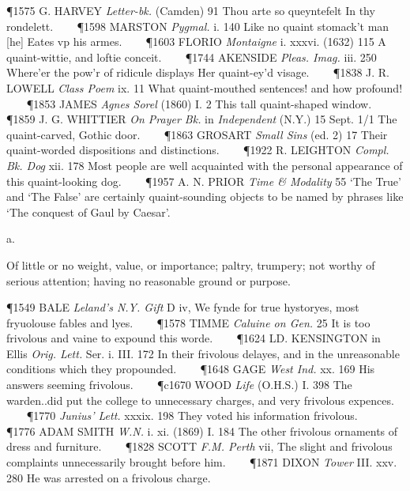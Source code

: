 \begin{description}[wide, labelwidth=!, labelindent=0pt]
\begin{myenumerate}
\P 1575 G. HARVEY  \textit{Letter-bk.} (Camden) 91 Thou arte so queyntefelt In thy rondelett.    
\P 1598 MARSTON  \textit{Pygmal.} i. 140 Like no quaint stomack't man [he] Eates vp his armes.    
\P 1603 FLORIO  \textit{Montaigne} i. xxxvi. (1632) 115 A quaint-wittie, and loftie conceit.    
\P 1744 AKENSIDE  \textit{Pleas. Imag.} iii. 250 Where'er the pow'r of ridicule displays Her quaint-ey'd visage.    
\P 1838 J. R. LOWELL  \textit{Class Poem} ix. 11 What quaint-mouthed sentences! and how profound!    
\P 1853 JAMES  \textit{Agnes Sorel} (1860) I. 2 This tall quaint-shaped window.    
\P 1859 J. G. WHITTIER  \textit{On Prayer Bk.} in \textit{Independent} (N.Y.) 15 Sept. 1/1 The quaint-carved, Gothic door.    
\P 1863 GROSART  \textit{Small Sins} (ed. 2) 17 Their quaint-worded dispositions and distinctions.    
\P 1922 R. LEIGHTON  \textit{Compl. Bk. Dog} xii. 178 Most people are well acquainted with the personal appearance of this quaint-looking dog.    
\P 1957 A. N. PRIOR  \textit{Time \& Modality} 55 ‘The True’ and ‘The False’ are certainly quaint-sounding objects to be named by phrases like ‘The conquest of Gaul by Caesar’.
\end{myenumerate}

 a.

\noindent {}

\vspace{-0.3cm}

\begin{myenumerate}

 Of little or no weight, value, or importance; paltry, trumpery; not worthy of serious attention; having no reasonable ground or purpose.

\P 1549 BALE  \textit{Leland's N.Y. Gift} D iv, We fynde for true hystoryes, most fryuolouse fables and lyes.    
\P 1578 TIMME  \textit{Caluine on Gen.} 25 It is too frivolous and vaine to expound this worde.    
\P 1624 LD. KENSINGTON in Ellis  \textit{Orig. Lett.} Ser. i. III. 172 In their frivolous delayes, and in the unreasonable conditions which they propounded.    
\P 1648 GAGE  \textit{West Ind.} xx. 169 His answers seeming frivolous.    
\P c1670 WOOD  \textit{Life} (O.H.S.) I. 398 The warden..did put the college to unnecessary charges, and very frivolous expences.    
\P 1770 \textit{Junius'  Lett.} xxxix. 198 They voted his information frivolous.    
\P 1776 ADAM SMITH  \textit{W.N.} i. xi. (1869) I. 184 The other frivolous ornaments of dress and furniture.    
\P 1828 SCOTT  \textit{F.M. Perth} vii, The slight and frivolous complaints unnecessarily brought before him.    
\P 1871 DIXON  \textit{Tower} III. xxv. 280 He was arrested on a frivolous charge.


\end{myenumerate}
\end{description}
